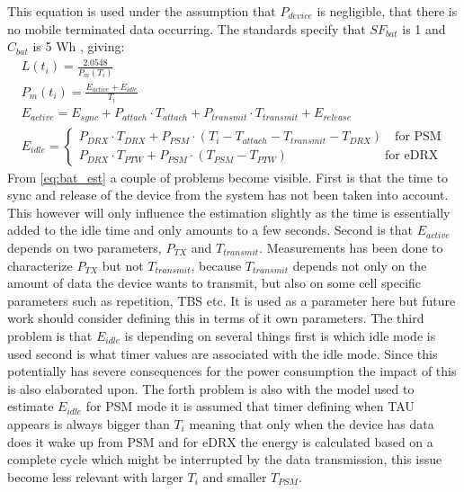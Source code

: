 This equation is used under the assumption that $P_{device}$ is negligible, that there is no mobile terminated data occurring. The standards specify that $SF_{bat}$ is 1 and $C_{bat}$ is 5 Wh \citep[sec. 5.4]{safty_factor_standard}, giving:
\begin{equation}\label{eq:bat_est}
\begin{gathered}
	L(t_i) = \frac{2.0548}{P_m(T_i)} \\
	P_m(t_i) = \frac{E_{active} + E_{idle}}{T_i} \\
	E_{active} = E_{sync} + P_{attach}\cdot T_{attach} + P_{transmit}\cdot T_{transmit} + E_{release} \\
	E_{idle} = \begin{cases} P_{DRX}\cdot T_{DRX} + P_{PSM}\cdot (T_i - T_{attach} - T_{transmit} - T_{DRX}) \quad \text{for PSM}\\
							P_{DRX}\cdot T_{PTW} + P_{PSM} \cdot (T_{PSM} - T_{PTW}) \qquad\qquad\qquad\quad\;\;\, \text{for eDRX}
				\end{cases}
\end{gathered}
\end{equation}
From \autoref{eq:bat_est} a couple of problems become visible. 
First is that the time to sync and release of the device from the system has not been taken into account. This however will only influence the estimation slightly as the time is essentially added to the idle time and only amounts to a few seconds. 
Second is that $E_{active}$ depends on two parameters, $P_{TX}$ and $T_{transmit}$. Measurements has been done to characterize $P_{TX}$ but not $T_{transmit}$, because $T_{transmit}$ depends not only on the amount of data the device wants to transmit, but also on some cell specific parameters such as repetition, TBS etc. It is used as a parameter here but future work should consider defining this in terms of it own parameters. 
The third problem is that $E_{idle}$ is depending on several things first is which idle mode is used second is what timer values are associated with the idle mode. Since this potentially has severe consequences for the power consumption the impact of this is also elaborated upon. 
The forth problem is also with the model used to estimate $E_{idle}$ for PSM mode it is assumed that timer defining when \gls{TAU} appears is always bigger than $T_i$ meaning that only when the device has data does it wake up from PSM and for eDRX the energy is calculated based on a complete cycle which might be interrupted by the data transmission, this issue become less relevant with larger $T_i$ and smaller $T_{PSM}$. 

